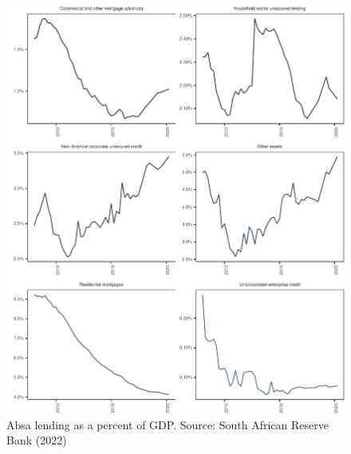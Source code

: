 \documentclass[
]{article}
\begin{document}
\begin{figure}[H]

\includegraphics{Bank_capital_and_bank_lending_files/figure-latex/ba900gdpabsa-1} \hfill{}

\caption{Absa lending as a percent of GDP. Source: South African Reserve Bank (2022)}\label{fig:ba900gdpabsa}
\end{figure}
\end{document}
